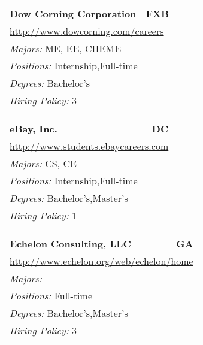 \documentclass[twoside]{article}
\begin{document}
\begin{center}
\begin{multicols}{3}
\begin{FlushLeft}
\begin{minipage}{.9\columnwidth}
\end{minipage}
 
\begin{minipage}{.9\columnwidth}\begin{tabularx}{.95\columnwidth}{Xr}
                 {\Large\bf Dow Corning Corporation} & {\Large\bf FXB}\\
    \multicolumn{2}{p{.95\columnwidth}}{\url{http://www.dowcorning.com/careers}}\\
    \multicolumn{2}{p{.95\columnwidth}}{\emph{Majors:} ME, EE, CHEME}\\
    \multicolumn{2}{p{.95\columnwidth}}{\emph{Positions:} Internship,Full-time}\\
    \multicolumn{2}{p{.95\columnwidth}}{\emph{Degrees:} Bachelor's}\\
    \multicolumn{2}{p{.95\columnwidth}}{\emph{Hiring Policy:} 3}\\
    \end{tabularx}
    
\end{minipage}
 
\begin{minipage}{.9\columnwidth}\begin{tabularx}{.95\columnwidth}{Xr}
                 {\Large\bf eBay, Inc.} & {\Large\bf DC}\\
    \multicolumn{2}{p{.95\columnwidth}}{\url{http://www.students.ebaycareers.com}}\\
    \multicolumn{2}{p{.95\columnwidth}}{\emph{Majors:} CS, CE}\\
    \multicolumn{2}{p{.95\columnwidth}}{\emph{Positions:} Internship,Full-time}\\
    \multicolumn{2}{p{.95\columnwidth}}{\emph{Degrees:} Bachelor's,Master's}\\
    \multicolumn{2}{p{.95\columnwidth}}{\emph{Hiring Policy:} 1}\\
    \end{tabularx}
    
\end{minipage}
 
\begin{minipage}{.9\columnwidth}\begin{tabularx}{.95\columnwidth}{Xr}
                 {\Large\bf Echelon Consulting, LLC} & {\Large\bf GA}\\
    \multicolumn{2}{p{.95\columnwidth}}{\url{http://www.echelon.org/web/echelon/home}}\\
    \multicolumn{2}{p{.95\columnwidth}}{\emph{Majors:} }\\
    \multicolumn{2}{p{.95\columnwidth}}{\emph{Positions:} Full-time}\\
    \multicolumn{2}{p{.95\columnwidth}}{\emph{Degrees:} Bachelor's,Master's}\\
    \multicolumn{2}{p{.95\columnwidth}}{\emph{Hiring Policy:} 3}\\
    \end{tabularx}
    

\end{minipage}
\end{FlushLeft}
\end{multicols}
\end{center}
\end{document}
